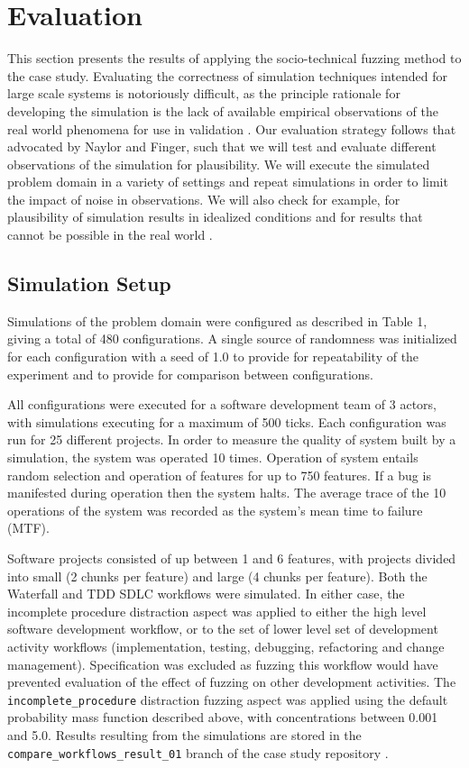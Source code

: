 \documentclass{llncs}
\begin{document}
 


\section{Evaluation}

This section presents the results of applying the socio-technical fuzzing method to the case study.  Evaluating the
correctness of simulation techniques intended for large scale systems is notoriously difficult, as the principle
rationale for developing the simulation is the lack of available empirical observations of the real world phenomena for
use in validation \citet{naylor67verification}.  Our evaluation strategy follows that advocated by Naylor and Finger,
such that we will test and evaluate different observations of the simulation for plausibility.  We will execute the
simulated problem domain in a variety of settings and repeat simulations in order to limit the impact of noise in
observations.  We will also check for example, for plausibility of simulation results in idealized conditions
\cite{shull11assuring} and for results that cannot be possible in the real world \cite{weyuker82testing}.

\subsection{Simulation Setup}

Simulations of the problem domain were configured as described in Table 1, giving a total of 480 configurations.  A
single source of randomness was initialized for each configuration with a seed of 1.0 to provide for repeatability of
the experiment and to provide for comparison between configurations.

All configurations were executed for a software development team of 3 actors, with simulations executing for a maximum
of 500 ticks.  Each configuration was run for 25 different projects.  In order to measure the quality of system built by
a simulation, the system was operated 10 times.  Operation of system entails random selection and operation of features
for up to 750 features.  If a bug is manifested during operation then the system halts.  The average trace of the 10
operations of the system was recorded as the system's mean time to failure (MTF).

Software projects consisted of up between 1 and 6 features, with projects divided into small (2 chunks per feature) and
large (4 chunks per feature). Both the Waterfall and TDD SDLC workflows were simulated.  In either case, the
incomplete procedure distraction aspect was applied to either the high level software development workflow, or to the
set of lower level set of development activity workflows (implementation, testing, debugging, refactoring and change
management).  Specification was excluded as fuzzing this workflow would have prevented evaluation of the effect of
fuzzing on other development activities.  The \lstinline!incomplete_procedure! distraction fuzzing aspect was applied
using the default probability mass function described above, with concentrations between 0.001 and 5.0.  Results
resulting from the simulations are stored in the \lstinline!compare_workflows_result_01! branch of the case study
repository \cite{ANON}.
\end{document}
